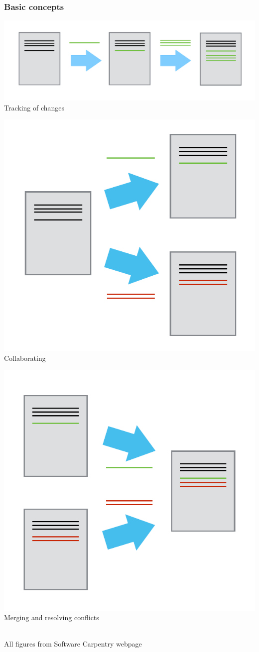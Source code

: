 \documentclass{beamer}
\begin{document}
\begin{frame}
  \frametitle{Basic concepts}
  \begin{center}
    \includegraphics[width=0.6\linewidth]{play-changes.pdf}\\
    Tracking of changes
  \end{center}
  \begin{minipage}{0.45\linewidth}
    \begin{center}
      \includegraphics[width=0.6\linewidth]{versions.pdf}\\
      Collaborating
    \end{center}
  \end{minipage}
  \begin{minipage}{0.45\linewidth}
    \begin{center}
      \includegraphics[width=0.6\linewidth]{merge.pdf}\\
      Merging and resolving conflicts
    \end{center}
  \end{minipage}\\[2ex]
  {\footnotesize All figures from Software Carpentry webpage}
\end{frame}
\end{document}
